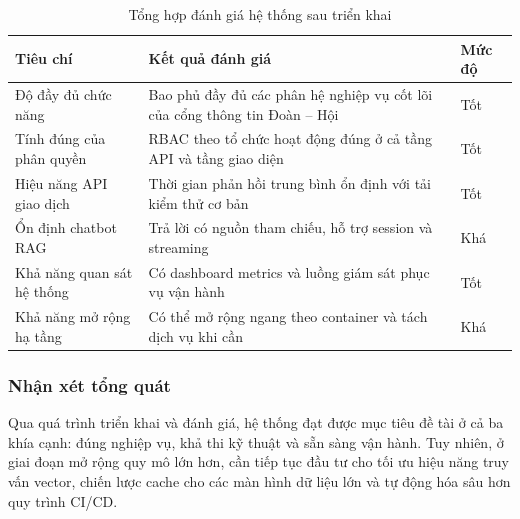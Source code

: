 \begin{table}[H]
\centering
\renewcommand{\arraystretch}{1.2}
\small
\begin{tabular}{|p{4.2cm}|p{6.0cm}|p{3.8cm}|}
\hline
\textbf{Tiêu chí} & \textbf{Kết quả đánh giá} & \textbf{Mức độ} \\
\hline
Độ đầy đủ chức năng & Bao phủ đầy đủ các phân hệ nghiệp vụ cốt lõi của cổng thông tin Đoàn -- Hội & Tốt \\
\hline
Tính đúng của phân quyền & RBAC theo tổ chức hoạt động đúng ở cả tầng API và tầng giao diện & Tốt \\
\hline
Hiệu năng API giao dịch & Thời gian phản hồi trung bình ổn định với tải kiểm thử cơ bản & Tốt \\
\hline
Ổn định chatbot RAG & Trả lời có nguồn tham chiếu, hỗ trợ session và streaming & Khá \\
\hline
Khả năng quan sát hệ thống & Có dashboard metrics và luồng giám sát phục vụ vận hành & Tốt \\
\hline
Khả năng mở rộng hạ tầng & Có thể mở rộng ngang theo container và tách dịch vụ khi cần & Khá \\
\hline
\end{tabular}
\caption{Tổng hợp đánh giá hệ thống sau triển khai}
\end{table}

\subsubsection{Nhận xét tổng quát}
Qua quá trình triển khai và đánh giá, hệ thống đạt được mục tiêu đề tài ở cả ba khía cạnh: đúng nghiệp vụ, khả thi kỹ thuật và sẵn sàng vận hành. Tuy nhiên, ở giai đoạn mở rộng quy mô lớn hơn, cần tiếp tục đầu tư cho tối ưu hiệu năng truy vấn vector, chiến lược cache cho các màn hình dữ liệu lớn và tự động hóa sâu hơn quy trình CI/CD.

\clearpage